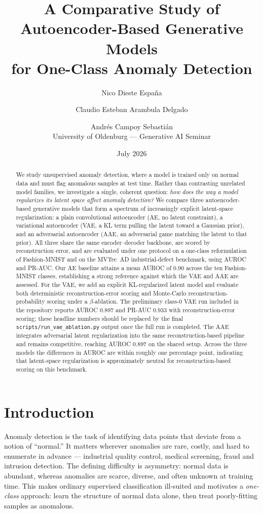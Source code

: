 \documentclass[11pt]{article}
\title{A Comparative Study of Autoencoder-Based Generative Models\\
for One-Class Anomaly Detection}
\author{Nico Dieste Espa\~na \and Claudio Esteban Arambula Delgado \and Andr\'es Campoy Sebasti\'an\\
\small University of Oldenburg --- Generative AI Seminar}
\date{July 2026}
\begin{document}
\maketitle

\begin{abstract}
We study unsupervised anomaly detection, where a model is trained only on
normal data and must flag anomalous samples at test time. Rather than contrasting
unrelated model families, we investigate a single, coherent question: \emph{how
does the way a model regularizes its latent space affect anomaly detection?} We
compare three autoencoder-based generative models that form a spectrum of
increasingly explicit latent-space regularization: a plain convolutional
autoencoder (AE, no latent constraint), a variational autoencoder (VAE, a KL
term pulling the latent toward a Gaussian prior), and an adversarial autoencoder
(AAE, an adversarial game matching the latent to that prior). All three share the
same encoder--decoder backbone, are scored by reconstruction error, and are
evaluated under one protocol on a one-class reformulation of Fashion-MNIST and on
the MVTec~AD industrial-defect benchmark, using AUROC and PR-AUC. Our AE baseline
attains a mean AUROC of $0.90$ across the ten Fashion-MNIST classes, establishing
a strong reference against which the VAE and AAE are assessed. For the VAE, we
add an explicit KL-regularized latent model and evaluate both deterministic
reconstruction-error scoring and Monte-Carlo reconstruction-probability scoring
under a $\beta$-ablation. The preliminary class-0 VAE run included in the
repository reports AUROC $0.897$ and PR-AUC $0.933$ with reconstruction-error
scoring; these headline numbers should be replaced by the final
\texttt{scripts/run\_vae\_ablation.py} output once the full run is completed.
The AAE integrates adversarial latent regularization into the same reconstruction-based pipeline and remains competitive, reaching AUROC $0.897$ on the shared setup. Across the three models the differences in AUROC are within roughly one percentage point, indicating that latent-space regularization is approximately neutral for reconstruction-based scoring on this benchmark.
\end{abstract}

\section{Introduction}   %
Anomaly detection is the task of identifying data points that deviate from a
notion of ``normal.'' It matters wherever anomalies are rare, costly, and hard
to enumerate in advance --- industrial quality control, medical screening,
fraud and intrusion detection. The defining difficulty is asymmetry: normal
data is abundant, whereas anomalies are scarce, diverse, and often unknown at
training time. This makes ordinary supervised classification ill-suited and
motivates a \emph{one-class} approach: learn the structure of normal data alone,
then treat poorly-fitting samples as anomalous.
\end{document}

